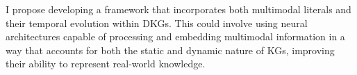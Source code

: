 I propose developing a framework that incorporates both multimodal literals and their temporal evolution within DKGs. This could involve using neural architectures capable of processing and 
embedding multimodal information in a way that accounts for both the static and dynamic nature of KGs, improving their ability to represent real-world knowledge.